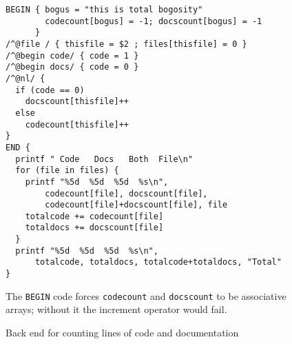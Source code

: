 \documentclass{article}
\newcommand\ltxlabel{\relax}
\let\ltxlabel=\label
\renewcommand\label{{\rm\it label\/}}
\begin{document}
\begin{figure}[!b]
\begin{verbatim} 
BEGIN { bogus = "this is total bogosity"
        codecount[bogus] = -1; docscount[bogus] = -1 
      }
/^@file / { thisfile = $2 ; files[thisfile] = 0 }
/^@begin code/ { code = 1 }
/^@begin docs/ { code = 0 }
/^@nl/ {
  if (code == 0)
    docscount[thisfile]++
  else
    codecount[thisfile]++
}
END { 
  printf " Code   Docs   Both  File\n"
  for (file in files) {
    printf "%5d  %5d  %5d  %s\n", 
        codecount[file], docscount[file],
        codecount[file]+docscount[file], file
    totalcode += codecount[file]
    totaldocs += docscount[file]
  } 
  printf "%5d  %5d  %5d  %s\n", 
      totalcode, totaldocs, totalcode+totaldocs, "Total"
}
\end{verbatim}
\caption{Back end for counting lines of code and documentation}
\ltxlabel{fig:nocount}

\smallskip

\noindent
The \verb+BEGIN+ code forces \verb+codecount+ and
\verb+docscount+ to be associative arrays; without it the increment
operator would fail.
\end{figure}





\end{document}
